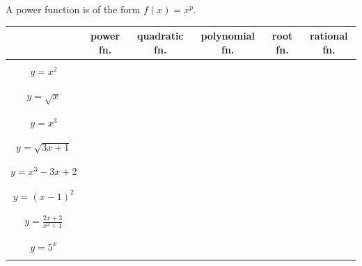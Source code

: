 \documentclass{article}
\begin{document}
A power function is of the form $f(x) = x^p$.\\

\begin{tabular}{| c | c | c | c | c | c | }
\hline
 & power fn. & quadratic fn. & polynomial fn. & root fn. & rational fn. \\
\hline
& & & & &\\
$y=x^2$ & & & & &\\
& & & & &\\
\hline
& & & & &\\
$y=\sqrt{x}$& & & & &\\
& & & & &\\
\hline
& & & & &\\
$y=x^3$ & & & & &\\
& & & & &\\
\hline
& & & & &\\
$y=\sqrt{3x+1}$ & & & & &\\
& & & & &\\
\hline 
& & & & &\\
$y=x^3 - 3x + 2$ & & & & &\\
& & & & &\\
\hline 
& & & & &\\
$y=(x-1)^2$ & & & & &\\
& & & & &\\
\hline 
& & & & &\\
$y=\frac{2x+3}{x^2+1}$ & & & & &\\
& & & & &\\
\hline 
& & & & &\\
$y=5^x$ & & & & &\\
& & & & &\\
\hline 
\end{tabular}
\end{document}
